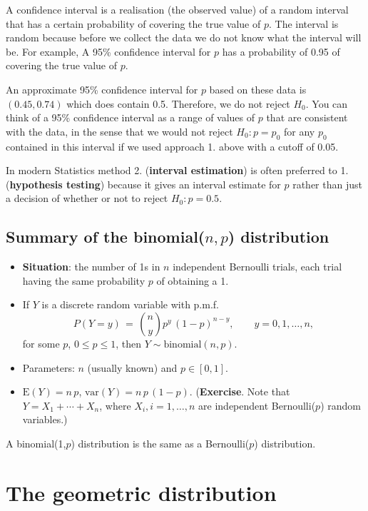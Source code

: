\documentclass[
  british,
  11pt,
  openany, a4paper]{book}
\providecommand{\tightlist}{%
  \setlength{\itemsep}{0pt}\setlength{\parskip}{0pt}}
\begin{document}
A confidence interval is a realisation (the observed value) of a random interval that has a certain probability of covering the true value of \(p\). The interval is random because before we collect the data we do not know what the interval will be. For example, A 95\% confidence interval for \(p\) has a probability of 0.95 of covering the true value of \(p\).

An approximate 95\% confidence interval for \(p\) based on these data is \((0.45,0.74)\) which does contain 0.5. Therefore, we do not reject \(H_0\). You can think of a 95\% confidence interval as a range of values of \(p\) that are consistent with the data, in the sense that we would not reject \(H_0: p = p_0\) for any \(p_0\) contained in this interval if we used approach 1. above with a cutoff of 0.05.

In modern Statistics method 2. (\textbf{interval estimation}) is often preferred to 1. (\textbf{hypothesis testing}) because it gives an interval estimate for \(p\) rather than just a decision of whether or not to reject \(H_0: p=0.5\).

\subsection{\texorpdfstring{Summary of the binomial(\(n,p\)) distribution}{Summary of the binomial(n,p) distribution}}\label{summary-of-the-binomialnp-distribution}

\begin{itemize}
\tightlist
\item
  \textbf{Situation}: the number of 1s in \(n\) independent Bernoulli trials,
  each trial having the same probability \(p\) of obtaining a 1.
\item
  If \(Y\) is a discrete random variable with p.m.f.
  \[ P(Y=y) \,=\, {n \choose y} p^y\,(1-p)^{n-y}, \qquad y=0,1,\ldots,n, \]
  for some \(p\), \(0 \leq p \leq 1\), then \(Y \sim \text{binomial}(n,p)\).
\item
  Parameters: \(n\) (usually known) and \(p \in [0,1]\).
\item
  \(\text{E}(Y)=n\,p\), \(\text{var}(Y)=n\,p\,(1-p)\). (\textbf{Exercise}. Note that \(Y=X_1 + \cdots + X_n\), where \(X_i, i=1, \ldots, n\) are independent Bernoulli(\(p\)) random variables.)
\end{itemize}

A binomial(1,\(p\)) distribution is the same as a Bernoulli(\(p\)) distribution.

\section{The geometric distribution}\label{the-geometric-distribution}
\end{document}
